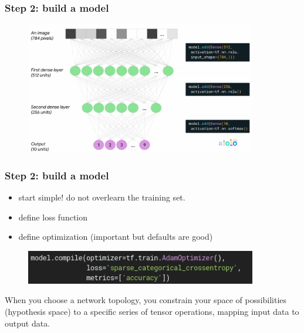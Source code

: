 \begin{frame}
        \frametitle{Step 2: build a model}

	\begin{figure}
                \includegraphics[width=0.9\textwidth]{Pics/nn_google.png}
        \end{figure}

\end{frame}

\begin{frame}
        \frametitle{Step 2: build a model}

	\begin{itemize}

	\item start simple! do not overlearn the training set.

	\item define loss function

	\item define optimization (important but defaults are good)

	\end{itemize}

	\begin{figure}
                \includegraphics[width=0.9\textwidth]{Pics/compile.png}
        \end{figure}

	\small
	When you choose a network topology, you constrain your space of possibilities (hypothesis space) 
	to a specific series of tensor operations, mapping input data to output data.

\end{frame}

